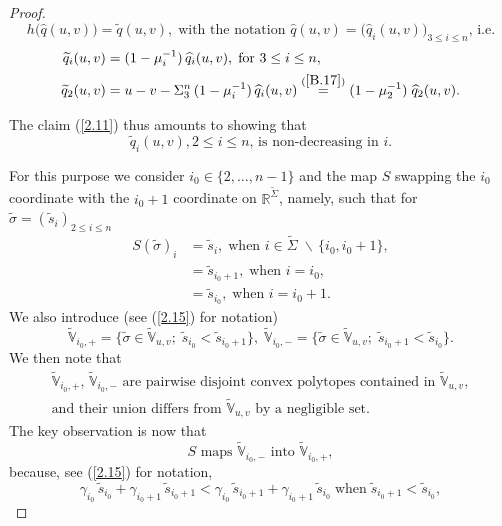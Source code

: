\documentclass[12pt,leqno]{article}
\def\IR{{\mathbb R}}
\def\IV{{\mathbb V}}
\def\n{\noindent}
\def\wh{\widehat}
\def\wt{\widetilde}
\begin{document}
\begin{proof}
\begin{equation} \label{2.16}
 h\big(\wh{q}(u,v)\big) = \wt{q}(u,v), \; \mbox{with the notation $\wh{q} (u,v) = \big(\wh{q}_i (u,v)\big)_{3 \le i \le n}$, i.e.}
 \end{equation}
\begin{equation}\label{2.17}
\begin{split}
 \wt{q}_i (u,v)  &= (1 - \mu^{-1}_i) \, \wh{q}_i (u,v), \; \mbox{for $3 \le i \le n$},
\\
 \wt{q}_2(u,v) &= u-v - \Sigma^n_3 \,(1 - \mu_i^{-1})\, \wh{q}_i(u,v) \stackrel{(\ref{B.17})}{=} (1 - \mu^{-1}_2) \; \wh{q}_2 (u,v).  
 \end{split}
\end{equation}

\medskip\n
The claim (\ref{2.11}) thus amounts to showing that
\begin{equation}\label{2.18}
\mbox{$\wt{q}_i (u,v), 2 \le i \le n$, is non-decreasing in $i$}.
\end{equation}

\n
For this purpose we consider $i_0 \in \{2, \dots, n-1\}$ and the map $S$ swapping the $i_0$ coordinate with the $i_0 + 1$ coordinate on $\IR^{\wt{\Sigma}}$, namely, such that for $\wt{\sigma} = (\wt{s}_i)_{2 \le i \le n}$
\begin{equation}\label{2.19}
\begin{split}
S(\wt{\sigma})_i & = \wt{s}_i, \; \mbox{when $i \in \wt{\Sigma}\; \backslash\,\{i_0, i_0 + 1\}$},
\\
& = \wt{s}_{i_0 + 1}, \; \mbox{when $i = i_0$},
\\
& = \wt{s}_{i_0}, \; \mbox{when $i = i_0 + 1$}.
\end{split}
\end{equation}
We also introduce (see (\ref{2.15}) for notation)
\begin{equation}\label{2.20}
\wt{\IV}_{i_0, +} = \{\wt{\sigma} \in \wt{\IV}_{u,v}; \; \wt{s}_{i_0} < \wt{s}_{i_0 + 1}\}, \; \wt{\IV}_{i_0,-} = \{\wt{\sigma} \in \wt{\IV}_{u,v}; \; \wt{s}_{i_0 + 1} < \wt{s}_{i_0}\}.
\end{equation}
We then note that
\begin{equation}\label{2.21}
\begin{array}{l}
\mbox{$\wt{\IV}_{i_0,+}$, $\wt{\IV}_{i_0,-}$ are pairwise disjoint convex polytopes contained in $\wt{\IV}_{u,v}$}, 
\\
\mbox{and their union differs from $\wt{\IV}_{u,v}$ by a negligible set}.
\end{array}
\end{equation}
The key observation is now that
\begin{equation}\label{2.22}
\mbox{$S$ maps $\wt{\IV}_{i_0, -}$ into $\wt{\IV}_{i_0, +}$},
\end{equation}
because, see (\ref{2.15}) for notation,
\begin{equation}\label{2.23}
\gamma_{i_0} \, \wt{s}_{i_0} + \gamma_{i_0 + 1} \, \wt{s}_{i_0 + 1} < \gamma_{i_0} \, \wt{s}_{i_0 + 1} + \gamma_{i_0 + 1} \, \wt{s}_{i_0} \; \mbox{when} \; \wt{s}_{i_0 + 1} < \wt{s}_{i_0},
\end{equation}


\end{proof}
\end{document}
